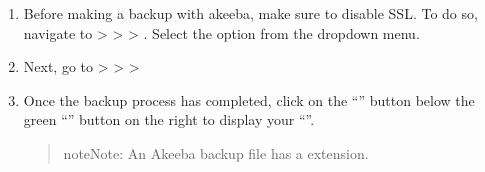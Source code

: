 \documentclass[a4paper,10pt,english,openany,oneside]{sphinxmanual}
\begin{document}
\begin{sloppypar}
\begin{enumerate}
\begin{quote}
\begin{figure}[H]
\centering

\noindent{}
\end{figure}
\end{quote}

\item {} 
\sphinxAtStartPar
Before making a backup with akeeba, make sure to \label{\detokenize{joomla-to-vps:disable-ssl}}disable SSL. To do so, navigate to  >  >  > . Select the option  from the drop\sphinxhyphen{}down menu.
\begin{quote}

\begin{figure}[H]
\centering

\noindent{}
\end{figure}
\end{quote}

\item {} 
\sphinxAtStartPar
Next, go to  >  >  > 
\begin{quote}

\begin{figure}[H]
\centering

\noindent{}
\end{figure}
\end{quote}

\item {} 
\sphinxAtStartPar
Once the backup process has completed, click on the “” button below the green “” button on the right to display your “”.
\begin{quote}

\begin{sphinxadmonition}{note}{Note:}
\sphinxAtStartPar
An Akeeba backup file has a  extension.
\end{sphinxadmonition}

\begin{figure}[H]
\centering

\noindent{}
\end{figure}
\end{quote}


\end{enumerate}
\end{sloppypar}
\end{document}
